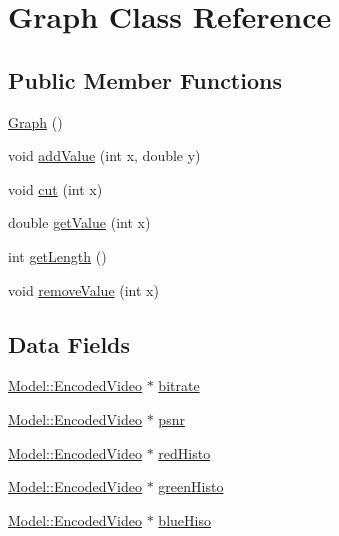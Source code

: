 \hypertarget{classModel_1_1Graph}{}\section{Graph Class Reference}
\label{classModel_1_1Graph}
\subsection*{Public Member Functions}
\begin{DoxyCompactItemize}
\item 
\hyperlink{classModel_1_1Graph_afc5ef9d72cc2c509814200791eaef62c}{Graph} ()
\item 
void \hyperlink{classModel_1_1Graph_ad4f64ac7b49c53bcfe6e62f538381a50}{add\+Value} (int x, double y)
\item 
void \hyperlink{classModel_1_1Graph_a940d481971e87001c6e4c17585b41a8e}{cut} (int x)
\item 
double \hyperlink{classModel_1_1Graph_aacd99feb76afec4bc9bdf645d4585880}{get\+Value} (int x)
\item 
int \hyperlink{classModel_1_1Graph_aab0d4bbd0884d04dbe281cc2b9d21206}{get\+Length} ()
\item 
void \hyperlink{classModel_1_1Graph_a88400b56c971065fc52ce8c02ecaffcd}{remove\+Value} (int x)
\end{DoxyCompactItemize}
\subsection*{Data Fields}
\begin{DoxyCompactItemize}
\item 
\hyperlink{classModel_1_1EncodedVideo}{Model\+::\+Encoded\+Video} $\ast$ \hyperlink{classModel_1_1Graph_a340d02df4a8d3c909b9242c450c2c4fa}{bitrate}
\item 
\hyperlink{classModel_1_1EncodedVideo}{Model\+::\+Encoded\+Video} $\ast$ \hyperlink{classModel_1_1Graph_a6476f7924ca1e0e066bbb0da6f5ea5de}{psnr}
\item 
\hyperlink{classModel_1_1EncodedVideo}{Model\+::\+Encoded\+Video} $\ast$ \hyperlink{classModel_1_1Graph_a826dee34980905d4300038e1ebc8efaf}{red\+Histo}
\item 
\hyperlink{classModel_1_1EncodedVideo}{Model\+::\+Encoded\+Video} $\ast$ \hyperlink{classModel_1_1Graph_adb7c23252690d5783f98e23046f785e8}{green\+Histo}
\item 
\hyperlink{classModel_1_1EncodedVideo}{Model\+::\+Encoded\+Video} $\ast$ \hyperlink{classModel_1_1Graph_a478d40084049d5801d2c7c70a4447133}{blue\+Hiso}
\end{DoxyCompactItemize}


